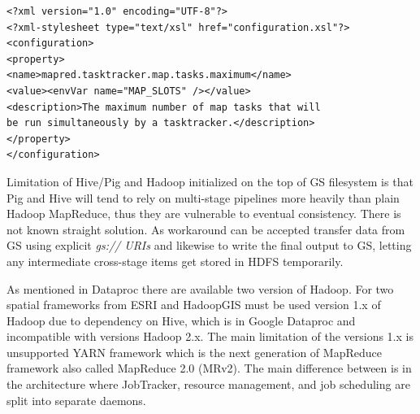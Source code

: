 \documentclass[a4paper,12pt,oneside]{report}
\begin{document}
	\begin{footnotesize}
		\begin{lstlisting}[style=XML]
<?xml version="1.0" encoding="UTF-8"?>
<?xml-stylesheet type="text/xsl" href="configuration.xsl"?>
<configuration>
<property>
<name>mapred.tasktracker.map.tasks.maximum</name>
<value><envVar name="MAP_SLOTS" /></value>
<description>The maximum number of map tasks that will 
be run simultaneously by a tasktracker.</description>
</property>
</configuration>
		\end{lstlisting}
	\end{footnotesize}
	
    Limitation of Hive/Pig and Hadoop initialized on the top of GS filesystem is that Pig and Hive 
    will tend to rely on multi-stage pipelines more heavily than plain Hadoop MapReduce, 
    thus they are vulnerable to eventual  consistency. There is not known straight solution.
    As workaround can be accepted transfer data from GS using explicit \textit{gs:// URIs } and likewise 
    to write the final output to GS, letting any intermediate cross-stage items get stored in 
    HDFS temporarily.
    
    As mentioned in Dataproc there are available two version of Hadoop. For two spatial
    frameworks from ESRI and HadoopGIS must be used version 1.x of Hadoop due to 
    dependency on Hive, which is in Google Dataproc and incompatible with versions Hadoop 2.x. 
    The main limitation of the versions 1.x is unsupported  YARN framework which is the 
    next generation of MapReduce framework also called MapReduce 2.0 (MRv2)\cite{yarn}.  
    The main difference between is in the architecture where JobTracker, resource management, 
    and job scheduling are split into separate daemons.
    
   
    
\end{document}
